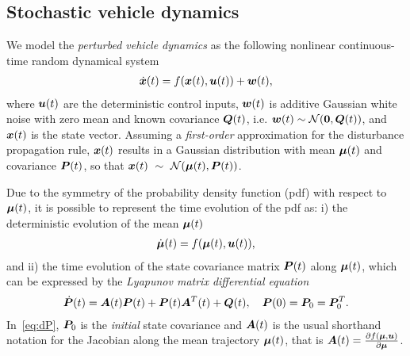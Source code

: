 \subsection{Stochastic vehicle dynamics}
\label{sec:stochastic_vehicle_dynamics}

We model the \emph{perturbed vehicle dynamics} as the following nonlinear continuous-time random dynamical system
\begin{align}
\dot{\boldsymbol{x}}(t) = f(\boldsymbol{x}(t), \boldsymbol{u}(t)) + \boldsymbol{w}(t),
\end{align}
where $\boldsymbol{u}(t)$ are the deterministic control inputs, $\boldsymbol{w}(t)$ is additive Gaussian white noise with zero mean and known covariance $\boldsymbol{Q}(t)$, i.e. $\boldsymbol{w}(t) \sim \mathcal{N}(\boldsymbol{0}, \boldsymbol{Q}(t))$, and $\boldsymbol{x}(t)$ is the state vector.
Assuming a \emph{first-order} approximation for the disturbance propagation rule, $\boldsymbol{x}(t)$ results in a Gaussian distribution with mean $\boldsymbol{\mu}(t)$ and covariance $\boldsymbol{P}(t)$, so that $\boldsymbol{x}(t)~\sim~\mathcal{N}(\boldsymbol{\mu}(t), \boldsymbol{P}(t))$.

Due to the symmetry of the probability density function (pdf) with respect to $\boldsymbol{\mu}(t)$, it is possible to represent the time evolution of the pdf as: i) the deterministic evolution of the mean $\boldsymbol{\mu}(t)$
\begin{align}\label{eq:meandynamics}
\dbmu(t) = f(\bmu(t), \bu(t)),
\end{align}
and ii) the time evolution of the state covariance matrix $\boldsymbol{P}(t)$ along $\boldsymbol{\mu}(t)$, which can be expressed by the \emph{Lyapunov matrix differential equation}
\begin{align}\label{eq:dP}
\dbP(t) = \bA(t) \bP(t) + \bP(t) \bA^T(t) + \bQ(t),\quad \bP(0) = \bP_0 = \bP_0^T.
\end{align}
In~\eqref{eq:dP}, $\boldsymbol{P}_0$ is the \emph{initial} state covariance and $\boldsymbol{A}(t)$ is the usual shorthand notation for the Jacobian along the mean trajectory $\boldsymbol{\mu}(t)$, that is $\boldsymbol{A}(t)=\frac{\partial f(\boldsymbol{\mu}, \boldsymbol{u})}{\partial \boldsymbol{\mu}}$.

